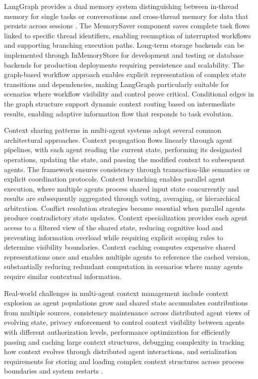 LangGraph provides a dual memory system distinguishing between in-thread memory for single tasks or conversations and cross-thread memory for data that persists across sessions \citep{langchain2024langgraph}. The MemorySaver component saves complete task flows linked to specific thread identifiers, enabling resumption of interrupted workflows and supporting branching execution paths. Long-term storage backends can be implemented through InMemoryStore for development and testing or database backends for production deployments requiring persistence and scalability. The graph-based workflow approach enables explicit representation of complex state transitions and dependencies, making LangGraph particularly suitable for scenarios where workflow visibility and control prove critical. Conditional edges in the graph structure support dynamic context routing based on intermediate results, enabling adaptive information flow that responds to task evolution.

Context sharing patterns in multi-agent systems adopt several common architectural approaches. Context propagation flows linearly through agent pipelines, with each agent reading the current state, performing its designated operations, updating the state, and passing the modified context to subsequent agents. The framework ensures consistency through transaction-like semantics or explicit coordination protocols. Context branching enables parallel agent execution, where multiple agents process shared input state concurrently and results are subsequently aggregated through voting, averaging, or hierarchical arbitration. Conflict resolution strategies become essential when parallel agents produce contradictory state updates. Context specialization provides each agent access to a filtered view of the shared state, reducing cognitive load and preventing information overload while requiring explicit scoping rules to determine visibility boundaries. Context caching computes expensive shared representations once and enables multiple agents to reference the cached version, substantially reducing redundant computation in scenarios where many agents require similar contextual information.

Real-world challenges in multi-agent context management include context explosion as agent populations grow and shared state accumulates contributions from multiple sources, consistency maintenance across distributed agent views of evolving state, privacy enforcement to control context visibility between agents with different authorization levels, performance optimization for efficiently passing and caching large context structures, debugging complexity in tracking how context evolves through distributed agent interactions, and serialization requirements for storing and loading complex context structures across process boundaries and system restarts \citep{foxgem2024memory}.

